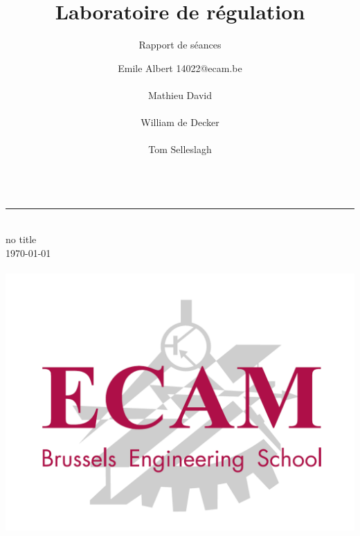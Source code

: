 \documentclass[10pt,a4paper]{article}
\title{Laboratoire de régulation}
\subtitle{Rapport de séances}
\author{
Emile Albert 14022@ecam.be\\\\
Mathieu David\\\\
William de Decker\\\\
Tom Selleslagh\\\\
}
\def\•subtitle{no title}
\begin{document}
\begin{titlepage} 
	\hspace{0.5cm}	
	\rule{1.5pt}{\textheight} 
	\hspace{1.5cm}		
	\parbox[b]{13cm}
	{  		
		{\huge \thetitle}\\[1\baselineskip]
		{\LARGE \•subtitle} \\[1\baselineskip]
		\today \\[3\baselineskip]
		
		{\Large \theauthor}\\[22\baselineskip]
		\hspace*{6cm}\includegraphics[scale=0.3]{logo_ECAM.png}
					
	}
\end{titlepage}

\tableofcontents
\newpage


\end{document}
